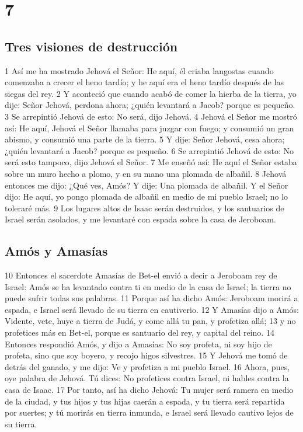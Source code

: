 \chapter{7}

\section*{Tres visiones de destrucción}

1 Así me ha mostrado Jehová el Señor: He aquí, él criaba langostas cuando comenzaba a crecer el heno tardío; y he aquí era el heno tardío después de las siegas del rey.
2 Y aconteció que cuando acabó de comer la hierba de la tierra, yo dije: Señor Jehová, perdona ahora; ¿quién levantará a Jacob? porque es pequeño.
3 Se arrepintió Jehová de esto: No será, dijo Jehová.
4 Jehová el Señor me mostró así: He aquí, Jehová el Señor llamaba para juzgar con fuego; y consumió un gran abismo, y consumió una parte de la tierra.
5 Y dije: Señor Jehová, cesa ahora; ¿quién levantará a Jacob? porque es pequeño.
6 Se arrepintió Jehová de esto: No será esto tampoco, dijo Jehová el Señor.
7 Me enseñó así: He aquí el Señor estaba sobre un muro hecho a plomo, y en su mano una plomada de albañil.
8 Jehová entonces me dijo: ¿Qué ves, Amós? Y dije: Una plomada de albañil. Y el Señor dijo: He aquí, yo pongo plomada de albañil en medio de mi pueblo Israel; no lo toleraré más.
9 Los lugares altos de Isaac serán destruidos, y los santuarios de Israel serán asolados, y me levantaré con espada sobre la casa de Jeroboam.

\section*{Amós y Amasías}

10 Entonces el sacerdote Amasías de Bet-el envió a decir a Jeroboam rey de Israel: Amós se ha levantado contra ti en medio de la casa de Israel; la tierra no puede sufrir todas sus palabras.
11 Porque así ha dicho Amós: Jeroboam morirá a espada, e Israel será llevado de su tierra en cautiverio.
12 Y Amasías dijo a Amós: Vidente, vete, huye a tierra de Judá, y come allá tu pan, y profetiza allá;
13 y no profetices más en Bet-el, porque es santuario del rey, y capital del reino.
14 Entonces respondió Amós, y dijo a Amasías: No soy profeta, ni soy hijo de profeta, sino que soy boyero, y recojo higos silvestres.
15 Y Jehová me tomó de detrás del ganado, y me dijo: Ve y profetiza a mi pueblo Israel.
16 Ahora, pues, oye palabra de Jehová. Tú dices: No profetices contra Israel, ni hables contra la casa de Isaac.
17 Por tanto, así ha dicho Jehová: Tu mujer será ramera en medio de la ciudad, y tus hijos y tus hijas caerán a espada, y tu tierra será repartida por suertes; y tú morirás en tierra inmunda, e Israel será llevado cautivo lejos de su tierra.

